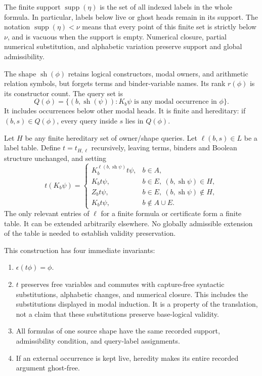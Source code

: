 \documentclass[
  11pt,
  letterpaper,
]{article}
\providecommand{\tightlist}{%
  \setlength{\itemsep}{0pt}\setlength{\parskip}{0pt}}
\begin{document}
The finite support \(\operatorname{supp}(\eta)\) is the set of all
indexed labels in the whole formula. In particular, labels below live or
ghost heads remain in its support. The notation
\(\operatorname{supp}(\eta)<\nu\) means that every point of this finite
set is strictly below \(\nu\), and is vacuous when the support is empty.
Numerical closure, partial numerical substitution, and alphabetic
variation preserve support and global admissibility.

The shape \(\operatorname{sh}(\phi)\) retains logical constructors,
modal owners, and arithmetic relation symbols, but forgets terms and
binder-variable names. Its rank \(r(\phi)\) is its constructor count.
The query set is \[
Q(\phi)=\{(b,\operatorname{sh}(\psi)):K_b\psi
\text{ is any modal occurrence in }\phi\}.
\] It includes occurrences below other modal heads. It is finite and
hereditary: if \((b,s)\in Q(\phi)\), every query inside \(s\) lies in
\(Q(\phi)\).

Let \(H\) be any finite hereditary set of owner/shape queries. Let
\(\ell(b,s)\in L\) be a label table. Define \(t=t_{H,\ell}\)
recursively, leaving terms, binders and Boolean structure unchanged, and
setting \[
t(K_b\psi)=
\begin{cases}
K_b^{\ell(b,\operatorname{sh}\psi)}t\psi,&b\in A,\\
K_b t\psi,&b\in E,\ (b,\operatorname{sh}\psi)\in H,\\
Z_b t\psi,&b\in E,\ (b,\operatorname{sh}\psi)\notin H,\\
K_b t\psi,&b\notin A\cup E.
\end{cases}
\] The only relevant entries of \(\ell\) for a finite formula or
certificate form a finite table. It can be extended arbitrarily
elsewhere. No globally admissible extension of the table is needed to
establish validity preservation.

This construction has four immediate invariants:

\begin{enumerate}
\def\labelenumi{\arabic{enumi}.}
\tightlist
\item
  \(\epsilon(t\phi)=\phi\).
\item
  \(t\) preserves free variables and commutes with capture-free
  syntactic substitutions, alphabetic changes, and numerical closure.
  This includes the substitutions displayed in modal induction. It is a
  property of the translation, not a claim that these substitutions
  preserve base-logical validity.
\item
  All formulas of one source shape have the same recorded support,
  admissibility condition, and query-label assignments.
\item
  If an external occurrence is kept live, heredity makes its entire
  recorded argument ghost-free.
\end{enumerate}
\end{document}
